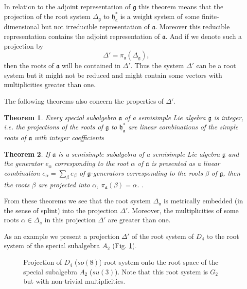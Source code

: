 \documentclass[12pt]{iopart}
\newtheorem{theorem}{Theorem}
\newcommand{\pia}{\pi_{\mathfrak{a}}}
\newcommand{\gf}{\mathfrak{g}}
\newcommand{\af}{\mathfrak{a}}
\newcommand{\hf}{\mathfrak{h}}
\newcommand{\hfa}{\hf_{\af}}
\begin{document}
In relation to the adjoint representation of $\gf$ this theorem means that the projection of the root system $\Delta_{\gf}$ to $\hfa^{*}$ is a weight system of some
finite-dimensional but not irreducible representation of $\af$. Moreover this reducible representation contains the adjoint representation of $\af$. And if we denote such a projection by
\begin{equation}
  \label{eq:2}
  \Delta'=\pia\left(\Delta_{\gf}\right),
\end{equation}
then the roots of $\af$ will be contained in $\Delta'$. Thus the system $\Delta'$ can be a root
system but it might not be reduced and might contain some vectors with multiplicities greater than
one.

The following theorems \cite{dynkin1952semisimple} also concern the properties of $\Delta'$. 

\begin{theorem}\label{dyn1}
  Every special subalgebra $\af$ of a semisimple Lie algebra $\gf$ is integer, i.e. the projections of
  the roots of $\gf$ to $\hfa^{*}$ are linear combinations of the simple roots of $\af$ with integer
  coefficients \cite{dynkin1952semisimple}
\end{theorem}

\begin{theorem}\label{dyn2}
  If $\af$  is a semisimple subalgebra of a semisimple Lie algebra $\gf$ and the generator $e_{\alpha}$ corresponding to
  the root $\alpha$ of $\af$ is presented as a linear combination $e_{\alpha}=\sum_{\beta}
  e_{\beta}$ of $\gf$-generators
  corresponding to the roots $\beta$ of $\gf$, then the roots $\beta$ are projected into $\alpha$,
  $\pia(\beta)=\alpha$. 
  \cite{dynkin1972semisimple,dynkin1952semisimple}. 
\end{theorem}

From these theorems we see that the root system $\Delta_{\af}$ is metrically embedded (in the sense
of splint) into the projection $\Delta'$. Moreover, the multiplicities of some roots
$\alpha\in\Delta_{\af}$ in this projection $\Delta'$ are greater than one. 

As an example we present a projection $\Delta'$ of the root system of $D_{4}$ to the root system of the special
subalgebra $A_{2}$ (Fig. \ref{fig:d4-a2_splint}).

\begin{figure}[h!bt]
  \noindent{}
  \caption{Projection of $D_{4}$ ($so(8)$)-root system onto the root space of the special subalgebra $A_{2}$
    ($su(3)$). Note that this root system is $G_{2}$ but with non-trivial multiplicities. }
 \label{fig:d4-a2_splint}
\end{figure}
\end{document}

